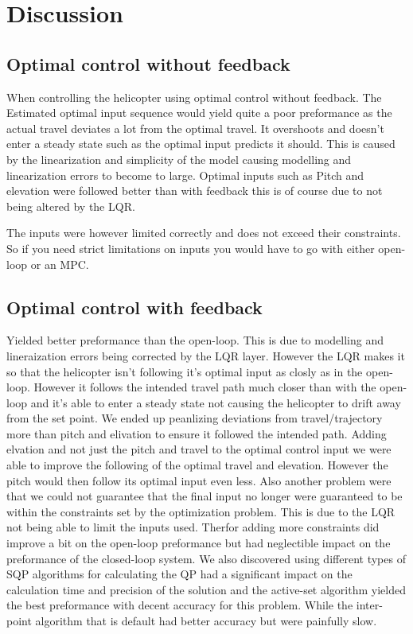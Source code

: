 \section{Discussion}\label{sec:discussion}

\subsection{Optimal control without feedback}
When controlling the helicopter using optimal control without feedback. The Estimated optimal input sequence would yield quite a poor preformance as the actual travel deviates a lot from the optimal travel. It overshoots and doesn't enter a steady state such as the optimal input predicts it should. This is caused by the linearization and simplicity of the model causing modelling and linearization errors to become to large. Optimal inputs such as Pitch and elevation were followed better than with feedback this is of course due to not being altered by the LQR. 

The inputs were however limited correctly and does not exceed their constraints. So if you need strict limitations on inputs you would have to go with either open-loop or an MPC.


\subsection{Optimal control with feedback}
Yielded better preformance than the open-loop. This is due to modelling and lineraization errors being corrected by the LQR layer. However the LQR makes it so that the helicopter isn't following it's optimal input as closly as in the open-loop. However it follows the intended travel path much closer than with the open-loop and it's able to enter a steady state not causing the helicopter to drift away from the set point. We ended up peanlizing deviations from travel/trajectory more than pitch and elivation to ensure it followed the intended path.
Adding elvation and not just the pitch and travel to the optimal control input we were able to improve the following of the optimal travel and elevation. However the pitch would then follow its optimal input even less.
Also another problem were that we could not guarantee that the final input no longer were guaranteed to be within the constraints set by the optimization problem. This is due to the LQR not being able to limit the inputs used. Therfor adding more constraints did improve a bit on the open-loop preformance but had neglectible impact on the preformance of the closed-loop system.
We also discovered using different types of SQP algorithms for calculating the QP had a significant impact on the calculation time and precision of the solution and the active-set algorithm yielded the best preformance with decent accuracy for this problem. While the inter-point algorithm that is default had better accuracy but were painfully slow.

